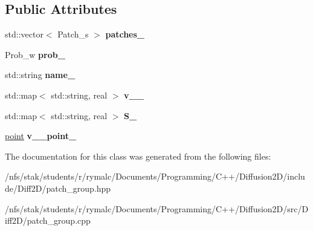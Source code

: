 \subsection*{Public Attributes}
\begin{DoxyCompactItemize}
\item 
\hypertarget{classPatch__Group_a637b27a0562076f78bf9b0698ac3609e}{std\+::vector$<$ Patch\+\_\+s $>$ {\bfseries patches\+\_\+}}\label{classPatch__Group_a637b27a0562076f78bf9b0698ac3609e}

\item 
\hypertarget{classPatch__Group_ac8d91a179d394f1d3d355d82ceb2dd2e}{Prob\+\_\+w {\bfseries prob\+\_\+}}\label{classPatch__Group_ac8d91a179d394f1d3d355d82ceb2dd2e}

\item 
\hypertarget{classPatch__Group_ac28afa5068ea65b91ce4d708f63c5a3a}{std\+::string {\bfseries name\+\_\+}}\label{classPatch__Group_ac28afa5068ea65b91ce4d708f63c5a3a}

\item 
\hypertarget{classPatch__Group_ae080e43ddd30ced473794b12a1cb3ccf}{std\+::map$<$ std\+::string, real $>$ {\bfseries v\+\_\+\_\+}}\label{classPatch__Group_ae080e43ddd30ced473794b12a1cb3ccf}

\item 
\hypertarget{classPatch__Group_aaad946bd88382b1e2e30cd1278632ace}{std\+::map$<$ std\+::string, real $>$ {\bfseries S\+\_\+}}\label{classPatch__Group_aaad946bd88382b1e2e30cd1278632ace}

\item 
\hypertarget{classPatch__Group_ab15832e1c3e273cfbb88e28407272af6}{\hyperlink{structpoint}{point} {\bfseries v\+\_\+\_\+point\+\_\+}}\label{classPatch__Group_ab15832e1c3e273cfbb88e28407272af6}

\end{DoxyCompactItemize}


The documentation for this class was generated from the following files\+:\begin{DoxyCompactItemize}
\item 
/nfs/stak/students/r/rymalc/\+Documents/\+Programming/\+C++/\+Diffusion2\+D/include/\+Diff2\+D/patch\+\_\+group.\+hpp\item 
/nfs/stak/students/r/rymalc/\+Documents/\+Programming/\+C++/\+Diffusion2\+D/src/\+Diff2\+D/patch\+\_\+group.\+cpp\end{DoxyCompactItemize}
